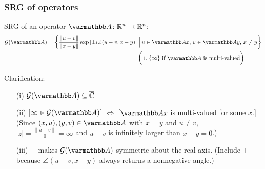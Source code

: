 \documentclass[10pt,mathserif]{beamer}
\begin{document}
\begin{frame}
\frametitle{SRG of operators}

SRG of an operator $\opA\colon\reals^n\rightrightarrows\reals^n$:
\begin{align*}
\mathcal{G}(\opA)&=
\left\{
\frac{\|u-v\|}{\|x-y\|}
\exp\left[\pm i \angle (u-v,x-y)\right]
\,\Big|\,
u\in \opA x,\,v\in \opA y,\, x\ne y \right\}\\
&\qquad\qquad\qquad\qquad\qquad\qquad\qquad\qquad
\bigg(\cup \{\infty\}\text{ if $\opA$ is multi-valued}\bigg)
\end{align*}

Clarification:
\begin{itemize}
\item[(i)] $\cG(\opA)\subseteq \ecomplex$
\item[(ii)] [$\infty\in \cG(\opA)$] $\Leftrightarrow$ [$\opA x$ is multi-valued for some $x$.]\\
(Since $(x,u),(y,v)\in \opA$ with $x=y$ and $u\ne v$,\\ $|z|=\frac{\|u-v\|}{0}=\infty$ and $u-v$ is infinitely larger than $x-y=0$.)
\item[(iii)] $\pm$ makes $\cG(\opA)$ symmetric about the real axis.
(Include $\pm$ because $\angle (u-v,x-y)$ always returns a nonnegative angle.)
\end{itemize}
\end{frame}
\end{document}
